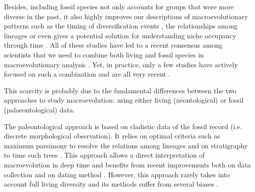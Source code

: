 Besides, including fossil species not only accounts for groups that were more diverse in the past, it also highly improves our descriptions of macroevolutionary patterns such as the timing of diversification events \citep[e.g. significantly reducing node age confidence intervals;][]{ronquista2012}, the relationships among lineages \citep[e.g. solving some controversial fossil placement;][]{Dembo2015} or even gives a potential solution for understanding niche occupancy through time \citep[e.g.][]{pearmanniche2008}.
All of these studies have led to a recent consensus among scientists that we need to combine both living and fossil species in macroevolutionary analysis \citep{jacksonwhat2006,quentaldiversity2010,dietlconservation2011,slaterunifying2013,fritzdiversity2013,benton2015}.
Yet, in practice, only a few studies have actively focused on such a combination and are all very recent \citep[e.g.][]{ronquista2012,slaterphylogenetic2013,Wood01032013,beckancient2014,Arcila2015131,Dembo2015}. %


This scarcity %
is probably due to the fundamental differences between the two approaches to study macroevolution: using either living (neontological) or fossil (palaeontological) data.

The paleontological approach %
 is based on cladistic data of the fossil record (i.e. discrete morphological observation).
It relies on optimal criteria such as maximum parsimony \citep{Hennig1966,felsenstein2004} to resolve the relations among lineages and on stratigraphy to time such trees \citep{GoloboffTNT}.
This approach allows a direct interpretation of macroevolution in deep time and benefits from recent improvements both on data collection \citep[e.g. 4541 characters in][introducing the term ``phenomics'']{O'Leary08022013} and on dating method \citep[e.g. the \textit{cal3} method from][]{Bapst2014}.
However, this approach rarely takes into account full living diversity \citep[e.g. only 38 out of 351 living primates for 119 fossils in][]{ni2013oldest} and its methods suffer from several biases \citep[e.g. parsimony;][]{wrightbayesian2014}.

